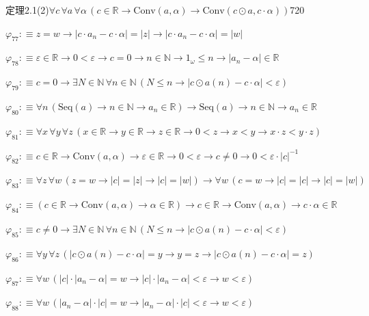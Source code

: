 \begin{fullproof}{定理2.1(2)}{$\forall c\,\forall a\,\forall \alpha\,(c \in \mathbb{R} \to \mathrm{Conv}(a,\alpha) \to \mathrm{Conv}(c \odot a,c \cdot \alpha))$}{720}
\begin{abbrevlist}
\item $\varphi_{77} :\equiv z = w \to \lvert c \cdot a_{n} - c \cdot \alpha \rvert = \lvert z \rvert \to \lvert c \cdot a_{n} - c \cdot \alpha \rvert = \lvert w \rvert$
\item $\varphi_{78} :\equiv \varepsilon \in \mathbb{R} \to 0 < \varepsilon \to c = 0 \to n \in \mathbb{N} \to 1_{\omega} \leq n \to \lvert a_{n} - \alpha \rvert \in \mathbb{R}$
\item $\varphi_{79} :\equiv c = 0 \to \exists N \in \mathbb{N}\,\forall n \in \mathbb{N}\,(N \leq n \to \lvert c \odot a(n) - c \cdot \alpha \rvert < \varepsilon)$
\item $\varphi_{80} :\equiv \forall n\,(\mathrm{Seq}(a) \to n \in \mathbb{N} \to a_{n} \in \mathbb{R}) \to \mathrm{Seq}(a) \to n \in \mathbb{N} \to a_{n} \in \mathbb{R}$
\item $\varphi_{81} :\equiv \forall x\,\forall y\,\forall z\,(x \in \mathbb{R} \to y \in \mathbb{R} \to z \in \mathbb{R} \to 0 < z \to x < y \to x \cdot z < y \cdot z)$
\item $\varphi_{82} :\equiv c \in \mathbb{R} \to \mathrm{Conv}(a,\alpha) \to \varepsilon \in \mathbb{R} \to 0 < \varepsilon \to c \neq 0 \to 0 < \varepsilon \cdot \lvert c \rvert^{-1}$
\item $\varphi_{83} :\equiv \forall z\,\forall w\,(z = w \to \lvert c \rvert = \lvert z \rvert \to \lvert c \rvert = \lvert w \rvert) \to \forall w\,(c = w \to \lvert c \rvert = \lvert c \rvert \to \lvert c \rvert = \lvert w \rvert)$
\item $\varphi_{84} :\equiv (c \in \mathbb{R} \to \mathrm{Conv}(a,\alpha) \to \alpha \in \mathbb{R}) \to c \in \mathbb{R} \to \mathrm{Conv}(a,\alpha) \to c \cdot \alpha \in \mathbb{R}$
\item $\varphi_{85} :\equiv c \neq 0 \to \exists N \in \mathbb{N}\,\forall n \in \mathbb{N}\,(N \leq n \to \lvert c \odot a(n) - c \cdot \alpha \rvert < \varepsilon)$
\item $\varphi_{86} :\equiv \forall y\,\forall z\,(\lvert c \odot a(n) - c \cdot \alpha \rvert = y \to y = z \to \lvert c \odot a(n) - c \cdot \alpha \rvert = z)$
\item $\varphi_{87} :\equiv \forall w\,(\lvert c \rvert \cdot \lvert a_{n} - \alpha \rvert = w \to \lvert c \rvert \cdot \lvert a_{n} - \alpha \rvert < \varepsilon \to w < \varepsilon)$
\item $\varphi_{88} :\equiv \forall w\,(\lvert a_{n} - \alpha \rvert \cdot \lvert c \rvert = w \to \lvert a_{n} - \alpha \rvert \cdot \lvert c \rvert < \varepsilon \to w < \varepsilon)$

\end{abbrevlist}
\end{fullproof}
